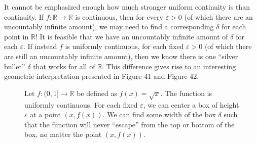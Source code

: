 \documentclass{article}
\newcommand{\R}{\mathbb{R}}
\theoremstyle{definition}
\begin{document}
	It cannot be emphasized enough how much stronger uniform continuity is than continuity. If $ f:\R\to\R $ is continuous, then for every $ \varepsilon>0 $ (of which there are an uncountably infinite amount), we may need to find a corresponding $ \delta $ for each point in $ \R $! It is feasible that we have an uncountably infinite amount of $ \delta $ for each $ \varepsilon $. If instead $ f $ is uniformly continuous, for each fixed $ \varepsilon>0 $ (of which there are still an uncountably infinite amount), then we know there is one ``silver bullet'' $ \delta $ that works for all of $ \R $. This difference gives rise to an interesting geometric interpretation presented in Figure 41 and Figure 42. 
	\begin{figure}[h!]
		\centering
		\caption{Let $ f:(0,1]\to\R $ be defined as $ f(x)=\sqrt{x} $. The function is uniformly continuous. For each fixed $ \varepsilon $, we can center a box of height $ \varepsilon $ at a point $ (x,f(x)) $. We can find some width of the box $ \delta $ such that the function will never ``escape'' from the top or bottom of the box, no matter the point $ (x,f(x)) $.}
	\end{figure}
\end{document}
